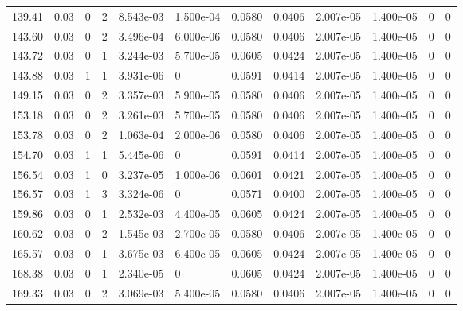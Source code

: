 \documentclass[preview]{standalone}
\begin{document}
{{{\begin{tabular}{L{1.2cm}C{1.2cm} C{0.3cm}C{0.5cm} C{1.4cm}C{1.4cm} C{1.4cm}C{1.4cm} C{1.6cm}C{1.6cm} C{1.6cm}C{1.6cm}}
  139.41  &  0.03  & 0     &  2 &  8.543e-03  & 1.500e-04  &  0.0580&   0.0406& 2.007e-05 & 1.400e-05   &  0 & 0  \\ 
  143.60  &  0.03  & 0     &  2 &  3.496e-04  & 6.000e-06  &  0.0580&   0.0406& 2.007e-05 & 1.400e-05   &  0 & 0  \\ 
  143.72  &  0.03  & 0     &  1 &  3.244e-03  & 5.700e-05  &  0.0605&   0.0424& 2.007e-05 & 1.400e-05   &  0 & 0  \\ 
  143.88  &  0.03  & 1     &  1 &  3.931e-06  & 0  &  0.0591&   0.0414& 2.007e-05 & 1.400e-05   &  0 & 0  \\ 
  149.15  &  0.03  & 0     &  2 &  3.357e-03  & 5.900e-05  &  0.0580&   0.0406& 2.007e-05 & 1.400e-05   &  0 & 0  \\ 
  153.18  &  0.03  & 0     &  2 &  3.261e-03  & 5.700e-05  &  0.0580&   0.0406& 2.007e-05 & 1.400e-05   &  0 & 0  \\ 
  153.78  &  0.03  & 0     &  2 &  1.063e-04  & 2.000e-06  &  0.0580&   0.0406& 2.007e-05 & 1.400e-05   &  0 & 0  \\ 
  154.70  &  0.03  & 1     &  1 &  5.445e-06  & 0  &  0.0591&   0.0414& 2.007e-05 & 1.400e-05   &  0 & 0  \\ 
  156.54  &  0.03  & 1     &  0 &  3.237e-05  & 1.000e-06  &  0.0601&   0.0421& 2.007e-05 & 1.400e-05   &  0 & 0  \\ 
  156.57  &  0.03  & 1     &  3 &  3.324e-06  & 0  &  0.0571&   0.0400& 2.007e-05 & 1.400e-05   &  0 & 0  \\ 
  159.86  &  0.03  & 0     &  1 &  2.532e-03  & 4.400e-05  &  0.0605&   0.0424& 2.007e-05 & 1.400e-05   &  0 & 0  \\ 
  160.62  &  0.03  & 0     &  2 &  1.545e-03  & 2.700e-05  &  0.0580&   0.0406& 2.007e-05 & 1.400e-05   &  0 & 0  \\ 
  165.57  &  0.03  & 0     &  1 &  3.675e-03  & 6.400e-05  &  0.0605&   0.0424& 2.007e-05 & 1.400e-05   &  0 & 0  \\ 
  168.38  &  0.03  & 0     &  1 &  2.340e-05  & 0  &  0.0605&   0.0424& 2.007e-05 & 1.400e-05   &  0 & 0  \\ 
  169.33  &  0.03  & 0     &  2 &  3.069e-03  & 5.400e-05  &  0.0580&   0.0406& 2.007e-05 & 1.400e-05   &  0 & 0  \\ 
\hline 
\end{tabular} 

}}}
\end{document}
